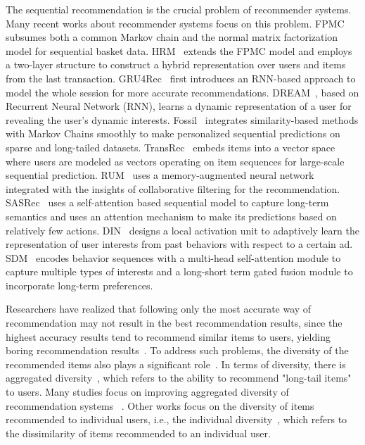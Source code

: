The sequential recommendation is the crucial problem of recommender systems. Many recent works about recommender systems focus on this problem. FPMC~\cite{rendle2010factorizing} subsumes both a common Markov chain and the normal matrix factorization model for sequential basket data. HRM~\cite{wang2015learning} extends the FPMC model and employs a two-layer structure to construct a hybrid representation over users and items from the last transaction. GRU4Rec~\cite{hidasi2015session} first introduces an RNN-based approach to model the whole session for more accurate recommendations. DREAM~\cite{yu2016dynamic}, based on Recurrent Neural Network (RNN), learns a dynamic representation of a user for revealing the user's dynamic interests. Fossil~\cite{he2016fusing} integrates similarity-based methods with Markov Chains smoothly to make personalized sequential predictions on sparse and long-tailed datasets. TransRec~\cite{he2017translation} embeds items into a vector space where users are modeled as vectors operating on item sequences for large-scale sequential prediction. RUM~\cite{chen2018sequential} uses a memory-augmented neural network integrated with the insights of collaborative filtering for the recommendation. SASRec~\cite{kang2018self} uses a self-attention based sequential model to capture long-term semantics and uses an attention mechanism to make its predictions based on relatively few actions. DIN~\cite{zhou2018deep} designs a local activation unit to adaptively learn the representation of user interests from past behaviors with respect to a certain ad. SDM~\cite{lv2019sdm} encodes behavior sequences with a multi-head self-attention module to capture multiple types of interests and a long-short term gated fusion module to incorporate long-term preferences.


Researchers have realized that following only the most accurate way of recommendation may not result in the best recommendation results, since the highest accuracy results tend to recommend similar items to users, yielding boring recommendation results~\cite{panniello2014comparing}. To address such problems, the diversity of the recommended items also plays a significant role~\cite{slaney2006measuring}. In terms of diversity, there is aggregated diversity~\cite{adomavicius2011improving}, which refers to the ability to recommend "long-tail items" to users. Many studies focus on improving aggregated diversity of recommendation systems  ~\cite{bag2019integrated,adomavicius2011improving,niemann2013new,qin2013promoting}. Other works focus on the diversity of items recommended to individual users, i.e., the individual diversity~\cite{adomavicius2011improving,yu2019recommendation,kalaivanan2013recommendation,di2014analysis}, which refers to the dissimilarity of items recommended to an individual user.

